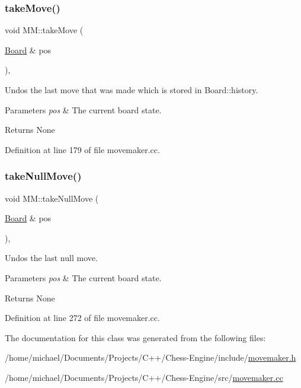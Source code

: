 \subsubsection{\texorpdfstring{take\+Move()}{takeMove()}}
{\footnotesize\ttfamily void M\+M\+::take\+Move (\begin{DoxyParamCaption}\item[{\mbox{\hyperlink{classBoard}{Board}} \&}]{pos }\end{DoxyParamCaption})\hspace{0.3cm}{\ttfamily [static]}, {\ttfamily [noexcept]}}



Undos the last move that was made which is stored in Board\+::history. 


\begin{DoxyParams}{Parameters}
{\em pos} & The current board state. \\
\hline
\end{DoxyParams}
\begin{DoxyReturn}{Returns}
None 
\end{DoxyReturn}


Definition at line 179 of file movemaker.\+cc.

\mbox{\label{classMM_aabe809e8405f8ea0666a7d6e25aedac5}} 
\subsubsection{\texorpdfstring{take\+Null\+Move()}{takeNullMove()}}
{\footnotesize\ttfamily void M\+M\+::take\+Null\+Move (\begin{DoxyParamCaption}\item[{\mbox{\hyperlink{classBoard}{Board}} \&}]{pos }\end{DoxyParamCaption})\hspace{0.3cm}{\ttfamily [static]}, {\ttfamily [noexcept]}}



Undos the last null move. 


\begin{DoxyParams}{Parameters}
{\em pos} & The current board state. \\
\hline
\end{DoxyParams}
\begin{DoxyReturn}{Returns}
None 
\end{DoxyReturn}


Definition at line 272 of file movemaker.\+cc.



The documentation for this class was generated from the following files\+:\begin{DoxyCompactItemize}
\item 
/home/michael/\+Documents/\+Projects/\+C++/\+Chess-\/\+Engine/include/\mbox{\hyperlink{movemaker_8h}{movemaker.\+h}}\item 
/home/michael/\+Documents/\+Projects/\+C++/\+Chess-\/\+Engine/src/\mbox{\hyperlink{movemaker_8cc}{movemaker.\+cc}}\end{DoxyCompactItemize}
